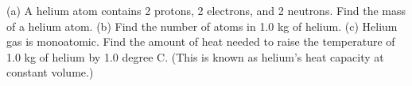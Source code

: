 (a) A helium atom contains 2 protons, 2 electrons, and 2
neutrons. Find the mass of a helium atom.  \answercheck\hwendpart
(b) Find the
number of atoms in 1.0 kg of helium.  \answercheck\hwendpart
(c) Helium gas is
monoatomic. Find the amount of heat needed to raise the
temperature of 1.0 kg of helium by 1.0 degree C. (This is known
as helium's heat capacity at constant volume.) \answercheck
